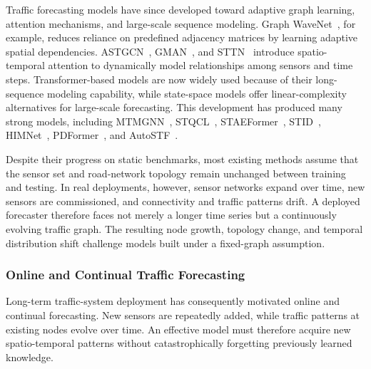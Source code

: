Traffic forecasting models have since developed toward adaptive graph learning, attention mechanisms, and large-scale sequence modeling. Graph WaveNet~\cite{wu2019graph}, for example, reduces reliance on predefined adjacency matrices by learning adaptive spatial dependencies. ASTGCN~\cite{guo2019attention}, GMAN~\cite{zheng2020gman}, and STTN~\cite{xu2020spatial} introduce spatio-temporal attention to dynamically model relationships among sensors and time steps. Transformer-based models are now widely used because of their long-sequence modeling capability, while state-space models offer linear-complexity alternatives for large-scale forecasting. This development has produced many strong models, including MTMGNN~\cite{yin2023mtmgnn}, STQCL~\cite{yin2024enhancing}, STAEFormer~\cite{liu2023spatio}, STID~\cite{shao2022spatial}, HIMNet~\cite{dong2024heterogeneity}, PDFormer~\cite{jiang2023pdformer}, and AutoSTF~\cite{lyu2025autostf}.

Despite their progress on static benchmarks, most existing methods assume that the sensor set and road-network topology remain unchanged between training and testing. In real deployments, however, sensor networks expand over time, new sensors are commissioned, and connectivity and traffic patterns drift. A deployed forecaster therefore faces not merely a longer time series but a continuously evolving traffic graph. The resulting node growth, topology change, and temporal distribution shift challenge models built under a fixed-graph assumption.

\subsubsection{Online and Continual Traffic Forecasting}

Long-term traffic-system deployment has consequently motivated online and continual forecasting. New sensors are repeatedly added, while traffic patterns at existing nodes evolve over time. An effective model must therefore acquire new spatio-temporal patterns without catastrophically forgetting previously learned knowledge.


